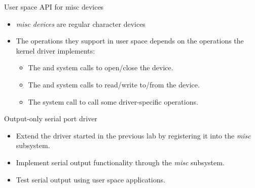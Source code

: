 \begin{frame}{User space API for misc devices}
  \begin{itemize}
  \item {\em misc devices} are regular character devices
  \item The operations they support in user space depends on the
    operations the kernel driver implements:
    \begin{itemize}
    \item The  and  system calls to
      open/close the device.
    \item The  and  system calls to
      read/write to/from the device.
    \item The  system call to call some driver-specific
      operations.
    \end{itemize}
  \end{itemize}
\end{frame}

\setuplabframe
{Output-only serial port driver}
{
  \begin{itemize}
  \item Extend the driver started in the previous lab by registering
    it into the {\em misc} subsystem.
  \item Implement serial output functionality through the {\em misc}
    subsystem.
  \item Test serial output using user space applications.
  \end{itemize}
}
